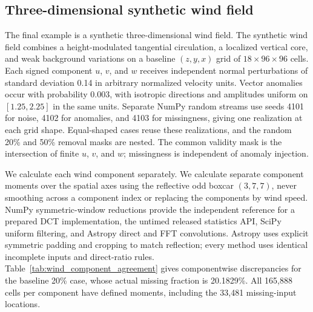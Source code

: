 \documentclass[a4paper,fleqn]{cas-sc}
\begin{document}
\FloatBarrier
\subsection{Three-dimensional synthetic wind field}

The final example is a synthetic three-dimensional wind field. The synthetic wind field combines a height-modulated tangential circulation, a localized vertical core, and weak background variations on a baseline $(z,y,x)$ grid of $18\times96\times96$ cells. Each signed component $u$, $v$, and $w$ receives independent normal perturbations of standard deviation 0.14 in arbitrary normalized velocity units. Vector anomalies occur with probability 0.003, with isotropic directions and amplitudes uniform on $[1.25,2.25]$ in the same units. Separate NumPy random streams use seeds 4101 for noise, 4102 for anomalies, and 4103 for missingness, giving one realization at each grid shape. Equal-shaped cases reuse these realizations, and the random 20\% and 50\% removal masks are nested. The common validity mask is the intersection of finite $u$, $v$, and $w$; missingness is independent of anomaly injection.

We calculate each wind component separately. We calculate separate component moments over the spatial axes using the reflective odd boxcar $(3,7,7)$, never smoothing across a component index or replacing the components by wind speed. NumPy symmetric-window reductions provide the independent reference for a prepared DCT implementation, the untimed released statistics API, SciPy uniform filtering, and Astropy direct and FFT convolutions. Astropy uses explicit symmetric padding and cropping to match reflection; every method uses identical incomplete inputs and direct-ratio rules. Table~\ref{tab:wind_component_agreement} gives componentwise discrepancies for the baseline 20\% case, whose actual missing fraction is 20.1829\%. All 165,888 cells per component have defined moments, including the 33,481 missing-input locations.

\end{document}

